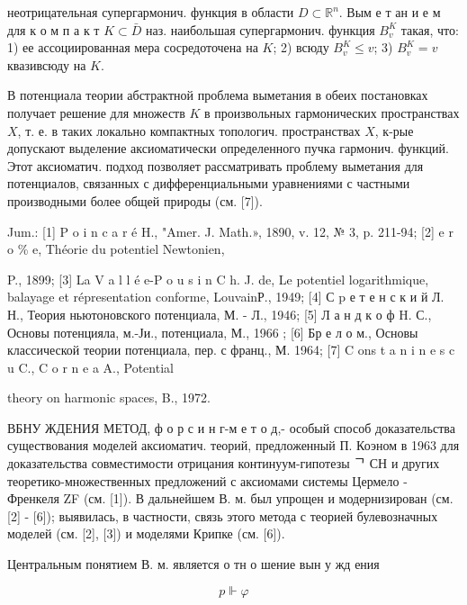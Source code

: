 \documentclass[10pt]{article}
\begin{document}
неотрицательная супергармонич. функция в области $D \subset \mathbb{R}^{n}$. Вым е т ан и е м для к о м п а к т $K \subset \bar{D}$ наз. наибольшая супергармонич. функция $B_{v}^{K}$ такая, что: 1) ее ассоциированная мера сосредоточена на $K$; 2) всюду $B_{v}^{K} \leqslant v$; 3) $B_{v}^{K}=v$ квазивсюду на $K$.



В потенциала теории абстрактной проблема выметания в обеих постановках получает решение для множеств $K$ в произвольных гармонических пространствах $X$, т. е. в таких локально компактных топологич. пространствах $X$, к-рые допускают выделение аксиоматически определенного пучка гармонич. функций. Этот аксиоматич. подход позволяет рассматривать проблему выметания для потенциалов, связанных с дифференциальными уравнениями с частными производными более общей природы (см. [7]).



Jum.: [1] P o i n c a r é H., "Amer. J. Math.», 1890, v. 12, № 3, p. 211-94; [2] e r o \% e, Théorie du potentiel Newtonien,

P., 1899; [3] La V a l l é e-P o u s i n C h. J. de, Le potentiel logarithmique, balayage et répresentation conforme, LouvainР., 1949; [4] С p е т е н с к и й Л. Н., Теория ньютоновского потенциала, М. - Л., 1946; [5] Л а н д к о ф H. С., Основы потенцияла, м.-Ји., потенциала, М., 1966 ; [6] Бр е л о м., Основы классической теории потенциала, пер. с франц., М. 1964; [7] C ons t a n i n e s c u C., C o r n e a A., Potential

theory on harmonic spaces, B., 1972.



ВБНУ ЖДЕНИЯ МЕТОД, ф о р с и н г-м е т о д,- особый способ доказательства существования моделей аксиоматич. теорий, предложенный П. Коэном в 1963 для доказательства совместимости отрицания континуум-гипотезы ᄀ СН и других теоретико-множественных предложений с аксиомами системы Цермело - Френкеля ZF (см. [1]). В дальнейшем В. м. был упрощен и модернизирован (см. [2] - [6]); выявилась, в частности, связь этого метода с теорией булевозначных моделей (см. [2], [3]) и моделями Крипке (см. [6]).



Центральным понятием В. м. является о тн о шение вын у жд ения



\[

p \Vdash \varphi

\]
\end{document}
